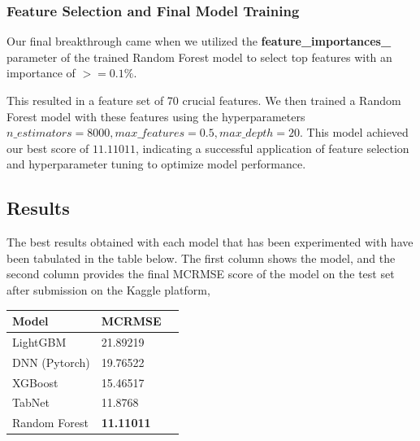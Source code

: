 \documentclass{article}
\begin{document}
\subsubsection{Feature Selection and Final Model Training}
Our final breakthrough came when we utilized the \textbf{feature\_importances\_} parameter of the trained Random Forest model to select top features with an importance of $>= 0.1\%$. 

This resulted in a feature set of 70 crucial features. We then trained a Random Forest model with these features using the hyperparameters $n\_estimators=8000, max\_features=0.5, max\_depth=20$. This model achieved our best score of $11.11011$, indicating a successful application of feature selection and hyperparameter tuning to optimize model performance.

\subsection{Results}
The best results obtained with each model that has been experimented with have been tabulated in the table below. The first column shows the model, and the second column provides the final MCRMSE score of the model on the test set after submission on the Kaggle platform,

\begin{center}    
\begin{tabular}{@{}llr@{}} \toprule
\textbf{Model} & \textbf{MCRMSE} \\ \midrule
LightGBM & 21.89219 \\
DNN (Pytorch) & 19.76522 \\
XGBoost & 15.46517 \\
TabNet & 11.8768 \\
Random Forest & \textbf{11.11011} \\ \bottomrule
\end{tabular}
\end{center}
\end{document}
